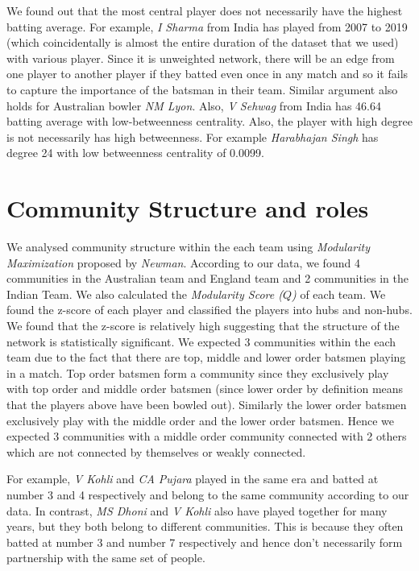 \documentclass{article}
\begin{document}
\newpage
We found out that the most central player does not necessarily have the highest batting average. For example, \textit{I Sharma} from India has played from 2007 to 2019 (which coincidentally is almost the entire duration of the dataset that we used) with various player. Since it is unweighted network, there will be an edge from one player to another player if they batted even once in any match and so it fails to capture the importance of the batsman in their team. Similar argument also holds for Australian bowler \textit{NM Lyon}. Also, \textit{V Sehwag} from India has 46.64 batting average with low-betweenness centrality. Also, the player with high degree is not necessarily has high betweenness. For example \textit{Harabhajan Singh} has degree 24 with low betweenness centrality of 0.0099.

\section{Community Structure and roles}
We analysed community structure within the each team using \textit{Modularity Maximization} proposed by \textit{Newman}. According to our data, we found 4 communities in the Australian team and England team and 2 communities in the Indian Team. We also calculated the \textit{Modularity Score ($Q$)} of each team. We found the z-score of each player and classified the players into hubs and non-hubs. We found that the z-score is relatively high suggesting that the structure of the network is statistically significant. We expected 3 communities within the each team due to the fact that there are top, middle and lower order batsmen playing in a match. Top order batsmen form a community since they exclusively play with top order and middle order batsmen (since lower order by definition means that the players above have been bowled out). Similarly the lower order batsmen exclusively play with the middle order and the lower order batsmen. Hence we expected 3 communities with a middle order community connected with 2 others which are not connected by themselves or weakly connected.

For example, \textit{V Kohli} and \textit{CA Pujara} played in the same era and batted at number 3 and 4 respectively and belong to the same community according to our data. In contrast, \textit{MS Dhoni} and \textit{V Kohli} also have played together for many years, but they both belong to different communities. This is because they often batted at number 3 and number 7 respectively and hence don't necessarily form partnership with the same set of people.
\end{document}
